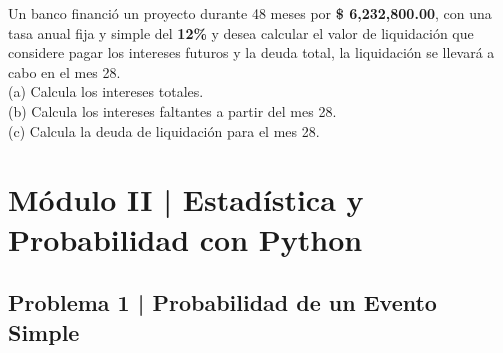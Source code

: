 \documentclass{article}
\begin{document}
Un banco financió un proyecto durante 48 meses por \textbf{\$ 6,232,800.00}, con una tasa anual fija y simple del \textbf{12\%} y desea calcular el valor de liquidación que considere pagar los intereses futuros y la deuda total, la liquidación se llevará a cabo en el mes 28.
\\[12pt]
(a) Calcula los intereses totales.
\\[6pt]
(b) Calcula los intereses faltantes a partir del mes 28.
\\[6pt]
(c) Calcula la deuda de liquidación para el mes 28.

\clearpage

\section*{Módulo II | Estadística y Probabilidad con Python}

\subsection*{Problema 1 | Probabilidad de un Evento Simple} 
\end{document}

